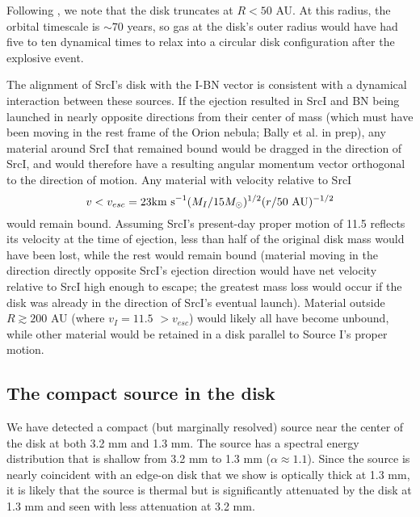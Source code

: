 \documentclass[twocolumn]{aastex62}
\newcommand{\sourcei}{SrcI\xspace}
\begin{document}
Following \citet{Bally2011a}, we note that the disk truncates at $R<50$
AU.  At this radius, the orbital timescale is $\sim70$ years, so gas at the
disk's outer radius would have had five to ten dynamical times to relax into a
circular disk configuration after the explosive event.

The alignment of \sourcei's disk with the I-BN vector is consistent with a
dynamical interaction between these sources.  If the ejection resulted in
\sourcei and BN being launched in nearly opposite directions from their center
of mass (which must have been moving in the rest frame of the Orion nebula; 
Bally et al. in prep), any material around \sourcei that remained bound would
be dragged in the direction of \sourcei, and would therefore have a resulting
angular momentum vector orthogonal to the direction of motion.  Any material
with
velocity relative to \sourcei 
$$v < v_{esc} = 23 \textrm{km~s}^{-1} (M_I/15M_{\odot})^{1/2}  (r/50~\mathrm{AU})^{-1/2}$$
would remain bound.
Assuming \sourcei's present-day proper motion of 11.5 \kms reflects its velocity
at the time of ejection, less than half of the original disk mass would
have been lost, while the rest would remain bound (material moving in the
direction directly opposite \sourcei's ejection direction would have net
velocity relative to \sourcei high enough to escape; the greatest mass
loss would occur if the disk was already in the direction of \sourcei's eventual
launch).
Material outside $R\gtrsim200$ AU (where $v_I=11.5$ \kms $> v_{esc}$) would
likely all have become unbound, while other material would be retained in a
disk parallel to Source I's proper motion.


\subsection{The compact source in the disk}
\label{sec:ptsrc}
We have detected a compact (but marginally resolved) source near the center of
the disk at both 3.2 mm and 1.3 mm.  The source has a spectral energy distribution
that is shallow from 3.2 mm to 1.3 mm ($\alpha\approx1.1$).  Since the source is nearly
coincident with an edge-on disk that we show is optically thick at 1.3 mm, it is
likely that the source is thermal but is significantly attenuated by the disk
at 1.3 mm and seen with less attenuation at 3.2 mm.
\end{document}
